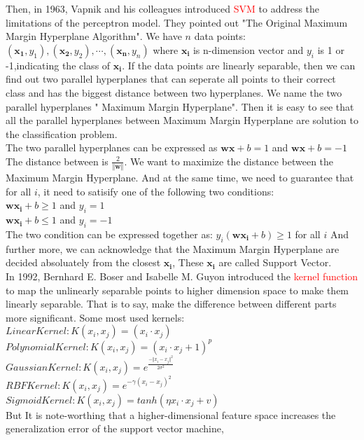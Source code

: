 \documentclass{article}
\begin{document}
Then, in 1963, Vapnik and his colleagues introduced \textcolor{red}{SVM} to address the limitations of the perceptron model.
They pointed out "The Original Maximum Margin Hyperplane Algorithm". We have $n$ data points: $(\bm{x_1},y_1),(\bm{x_2},y_2),\cdots, (\bm{x_n},y_n) $ where $\bm{x_i}$ is n-dimension vector and $y_i$ is 1 or -1,indicating the class of $\bm{x_i}$.
If the data points are linearly separable, 
then we can find out two parallel hyperplanes that can seperate all points to their correct class and has the biggest distance between two hyperplanes. 
We name the two parallel hyperplanes " Maximum Margin Hyperplane".
Then it is easy to see that all the parallel hyperplanes between Maximum Margin Hyperplane are solution to the classification problem.\\
\indent The two parallel hyperplanes can be expressed as $ \bm{w}\bm{x} + b = 1$ and $ \bm{w}\bm{x} + b = -1$  The distance between is $\frac{2}{\Vert \bm{w} \Vert}$.
We want to maximize the distance between the Maximum Margin Hyperplane. And at the same time, we need to guarantee that for all $i$, it need to satisify one of the following two conditions:\\
$\bm{w}\bm{x_i} + b \geq 1$ and $y_i = 1$\\
$\bm{w}\bm{x_i} + b \leq 1$ and $y_i = -1$\\
The two condition can be expressed together as:  $y_i(\bm{w}\bm{x_i} + b) \geq 1$ for all $i$ 
And further more, we can acknowledge that the Maximum Margin Hyperplane are decided absoluately from the closest $\bm{x_i}$, These $\bm{x_i}$ are called Support Vector.\\
\indent In 1992, Bernhard E. Boser and Isabelle M. Guyon introduced the \textcolor{red}{kernel function} to map the unlinearly separable points to higher dimension space to make them linearly separable.
That is to say, make the difference between different parts more significant. Some most used kernels:\\
$Linear Kernel: K(x_i,x_j) = (x_i · x_j)$\\
$Polynomial Kernel:K(x_i,x_j) = (x_i · x_j + 1)^p$\\
$Gaussian Kernel:K(x_i,x_j) = e^{\frac{-\Vert x_i-x_j \Vert^2}{2\sigma^2}}$\\
$RBF Kernel:K(x_i,x_j) = e^{-\gamma(x_i-x_j)^2}$\\
$Sigmoid Kernel:K(x_i,x_j) = tanh(\eta x_i·x_j + v)$\\
But It is note-worthing that a higher-dimensional feature space increases the generalization error of the support vector machine, 
\end{document}
